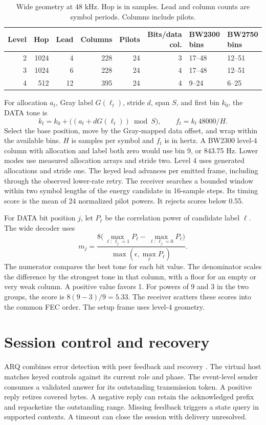\documentclass[11pt,letterpaper]{article}
\begin{document}
\begin{table}[htbp]
\centering\small
\begin{tabular}{@{}rrrrrrll@{}}
\toprule
Level & Hop & Lead & Columns & Pilots & Bits/data col. & BW2300 bins & BW2750 bins \\
\midrule
2 & 1024 & 4 & 228 & 24 & 3 & 17--48 & 12--51 \\
3 & 1024 & 6 & 228 & 24 & 4 & 17--48 & 12--51 \\
4 & 512 & 12 & 395 & 24 & 4 & 9--24 & 6--25 \\
\bottomrule
\end{tabular}
\caption{Wide geometry at 48 kHz. Hop is in samples. Lead and column counts
are symbol periods. Columns include pilots.}
\end{table}

For allocation \(a_t\), Gray label \(G(\ell_t)\), stride \(d\), span \(S\),
and first bin \(k_0\), the DATA tone is
\[
 k_t=k_0+\bigl((a_t+dG(\ell_t))\bmod S\bigr),\qquad f_t=k_t\,48000/H .
\]
Select the base position, move by the Gray-mapped data offset, and wrap
within the available bins. \(H\) is samples per symbol and \(f_t\) is in
hertz. A BW2300 level-4 column with allocation and label both zero would
use bin 9, or 843.75 Hz. Lower modes use measured allocation arrays and
stride two. Level 4 uses generated allocations and stride one. The keyed
lead advances per emitted frame, including through the observed lower-rate
retry. The receiver searches a bounded window within two symbol lengths
of the energy candidate in 16-sample steps. Its timing score is the mean
of 24 normalized pilot powers. It rejects scores below 0.55.

For DATA bit position \(j\), let \(P_\ell\) be the correlation power of
candidate label \(\ell\). The wide decoder uses
\[
 m_j=\frac{8\bigl(\max_{\ell:\,\ell_j=1}P_\ell
               -\max_{\ell:\,\ell_j=0}P_\ell\bigr)}
             {\max(\epsilon,\max_\ell P_\ell)}.
\]
The numerator compares the best tone for each bit value. The denominator
scales the difference by the strongest tone in that column, with a floor
for an empty or very weak column. A positive value favors 1. For powers
of 9 and 3 in the two groups, the score is \(8(9-3)/9=5.33\).
The receiver scatters these scores into the common FEC order.
The setup frame uses level-4 geometry.

\section{Session control and recovery}
ARQ combines error detection with peer feedback and recovery \cite{lin}.
The virtual host matches keyed controls against its current role and
phase. The event-level sender consumes a validated answer for its
outstanding transmission token. A positive reply retires covered bytes.
A negative reply can retain the acknowledged prefix and repacketize the
outstanding range. Missing feedback triggers a state query in supported
contexts. A timeout can close the session with delivery unresolved.
\end{document}
